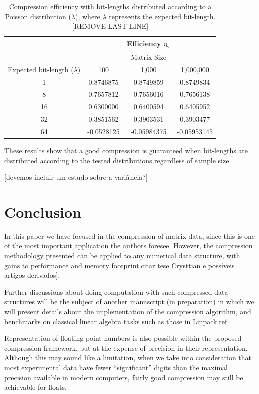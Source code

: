 \documentclass[10pt]{article}
\begin{document}
\begin{table}[h]
  \centering
  \caption{Compression efficiency with bit-lengths distributed according to a Poisson distribution ($\lambda$), where $\lambda$ represents the expected bit-length. [REMOVE LAST LINE]}
 \begin{tabular}{cccc}
    \hline
			& 	&Efficiency $\eta_2$      & \\
    \hline
			&  	&Matrix Size& \\
    Expected bit-length ($\lambda$)		& 100	& 1,000		    & 1,000,000 \\
    \hline
     1	& 0.8746875 & 0.8749859   & 0.8749834 \\
     8 	& 0.7657812 & 0.7656016   & 0.7656138 \\
     16	& 0.6300000 & 0.6400594   & 0.6405952 \\
     32	& 0.3851562 & 0.3903531   & 0.3903477 \\
     64	& -0.0528125& -0.05984375 & -0.05953145 \\
    \hline
 \end{tabular}
 \label{tab:05}
\end{table}

These results show that a good compression is guaranteed when bit-lengths are distributed according to the tested distributions regardless of sample size.

[devemos incluir um estudo sobre a variância?]
\section{Conclusion}
In this paper we have focused in the compression of matrix data, since this is one of the most important application the authors foresee. However, the compression methodology presented can be applied to any numerical data structure, with gains to performance and memory footprint[citar tese Crysttian e possíveis artigos derivados]. 

Further discussions about doing computation with such compressed data-structures will be the subject of another manuscript (in preparation) in which we will present details about the implementation of the compression algorithm, and benchmarks on classical linear algebra tasks such as those in Linpack[ref].

Representation of floating point numbers is also possible within the proposed compression framework, but at the expense of precision in their representation. Although this may sound like a limitation, when we take into consideration that most experimental data have fewer ``significant'' digits than the maximal precision available in modern computers, fairly good compression may still be achievable for floats.
\end{document}
